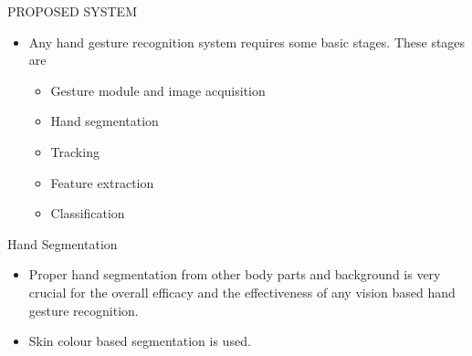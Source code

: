\documentclass{beamer}
\begin{document}
\begin{frame}{PROPOSED SYSTEM}
\vspace{0.5cm}
 \begin{itemize}
\item Any hand gesture recognition system requires some basic
stages. These stages are
\vspace{.5 cm}
 \begin{itemize}
\item Gesture module and image acquisition
\item \alert{Hand segmentation}
\item Tracking
\item Feature extraction
\item Classification

\end{itemize}
\end{itemize}
\end{frame} 

\begin{frame}{Hand Segmentation}
 \begin{itemize}
\item Proper hand segmentation from other body parts and
background is very crucial for the overall efficacy and the
effectiveness of any vision based hand gesture recognition.
\vspace{0.5 cm}
\item Skin colour based segmentation is used.
  

   

\end{itemize}
\end{frame}
\end{document}
